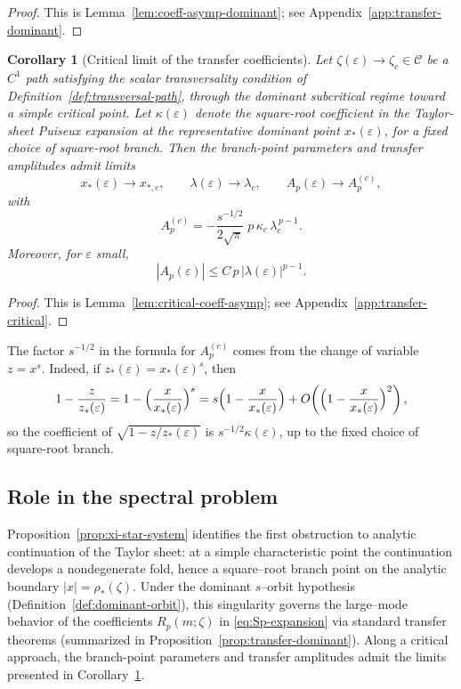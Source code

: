 \documentclass[11pt]{amsart}
\numberwithin{equation}{section}
\theoremstyle{plain}
\newtheorem{corollary}[theorem]{Corollary}
\theoremstyle{definition}
\theoremstyle{remark}
\begin{document}
\begin{proof}
	This is Lemma~\ref{lem:coeff-asymp-dominant}; see Appendix~\ref{app:transfer-dominant}.
\end{proof}

\begin{corollary}[Critical limit of the transfer coefficients]
	\label{cor:transfer-critical-data}
	Let $\zeta(\varepsilon)\to\zeta_c\in\mathcal C$ be a $C^1$ path satisfying the scalar
	transversality condition of Definition~\ref{def:transversal-path}, through the dominant
	subcritical regime toward a simple critical point. Let $\kappa(\varepsilon)$ denote the square-root
	coefficient in the Taylor-sheet Puiseux expansion at the representative dominant point
	$x_*(\varepsilon)$, for a fixed choice of square-root branch. Then the branch-point parameters and
	transfer amplitudes admit limits
	\[
		x_*(\varepsilon)\to x_{*,c},
		\qquad
		\lambda(\varepsilon)\to\lambda_c,
		\qquad
		A_p(\varepsilon)\to A_p^{(c)},
	\]
	with
	\[
		A_p^{(c)}
		=
		-\frac{s^{-1/2}}{2\sqrt{\pi}}\;p\,\kappa_c\,\lambda_c^{\,p-1}.
	\]
	Moreover, for $\varepsilon$ small,
	\[
		|A_p(\varepsilon)|\le C\,p\,|\lambda(\varepsilon)|^{p-1}.
	\]
\end{corollary}

\begin{proof}
	This is Lemma~\ref{lem:critical-coeff-asymp}; see Appendix~\ref{app:transfer-critical}.
\end{proof}


	The factor $s^{-1/2}$ in the formula for $A_p^{(c)}$ comes from the change of
	variable $z=x^s$. Indeed, if $z_*(\varepsilon)=x_*(\varepsilon)^s$, then
	\[
		1-\frac{z}{z_*(\varepsilon)}
		=
		1-\Bigl(\frac{x}{x_*(\varepsilon)}\Bigr)^s
		=
		s\Bigl(1-\frac{x}{x_*(\varepsilon)}\Bigr)
		+
		O\!\left(\Bigl(1-\frac{x}{x_*(\varepsilon)}\Bigr)^2\right),
	\]
	so the coefficient of $\sqrt{1-z/z_*(\varepsilon)}$ is
	$s^{-1/2}\kappa(\varepsilon)$, up to the fixed choice of square-root branch.


\subsection{Role in the spectral problem}
\label{subsec:role-spectral}

Proposition~\ref{prop:xi-star-system} identifies the first obstruction to analytic continuation of the
Taylor sheet: at a simple characteristic point the continuation develops a nondegenerate fold, hence a
square--root branch point on the analytic boundary $|x|=\rho_*(\zeta)$.  Under the dominant $s$--orbit
hypothesis (Definition~\ref{def:dominant-orbit}), this singularity governs the large--mode behavior of
the coefficients $R_p(m;\zeta)$ in \eqref{eq:Sp-expansion} via standard transfer theorems
(summarized in Proposition~\ref{prop:transfer-dominant}). Along a critical approach, the branch-point parameters and transfer amplitudes admit the limits presented in Corollary~\ref{cor:transfer-critical-data}.
\end{document}

